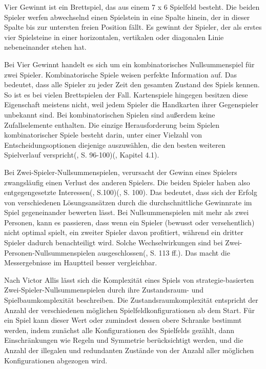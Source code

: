 Vier Gewinnt ist ein Brettspiel, das aus einem 7 x 6 Spielfeld besteht. Die beiden Spieler werfen abwechselnd einen Spielstein in eine Spalte hinein, der in dieser Spalte bis zur untersten freien Position fällt. Es gewinnt der Spieler, der als erstes vier Spielsteine in einer horizontalen, vertikalen oder diagonalen Linie nebeneinander stehen hat\cite{MiltonBradleyCompany.1990}.

Bei Vier Gewinnt handelt es sich um ein kombinatorisches Nullsummenspiel für zwei Spieler. Kombinatorische Spiele weisen \glqq perfekte Information\grqq{} auf. Das bedeutet, dass alle Spieler zu jeder Zeit den gesamten Zustand des Spiels kennen. So ist es bei vielen Brettspielen der Fall. Kartenspiele hingegen besitzen diese Eigenschaft meistens nicht, weil jedem Spieler die Handkarten ihrer Gegenspieler unbekannt sind. Bei kombinatorischen Spielen sind außerdem keine Zufallselemente enthalten. Die einzige Herausforderung beim Spielen kombinatorischer Spiele besteht darin, unter einer Vielzahl von Entscheidungsoptionen diejenige auszuwählen, die den besten weiteren Spielverlauf verspricht(\cite{Bewersdorff.2018}, S. 96-100)(\cite{Ferguson.January2019}, Kapitel 4.1).

Bei Zwei-Spieler-Nullsummenspielen, verursacht der Gewinn eines Spielers zwangsläufig einen Verlust des anderen Spielers. Die beiden Spieler haben also entgegengesetzte Interessen(\cite{Bewersdorff.2018}, S.100)(\cite{Allis.1994}, S. 100). Das bedeutet, dass sich der Erfolg von verschiedenen Lösungsansätzen durch die durchschnittliche Gewinnrate im Spiel gegeneinander bewerten lässt. Bei Nullsummenspielen mit mehr als zwei Personen, kann es passieren, dass wenn ein Spieler (bewusst oder versehentlich) nicht optimal spielt, ein zweiter Spieler davon profitiert, während ein dritter Spieler dadurch benachteiligt wird. Solche Wechselwirkungen sind bei Zwei-Personen-Nullsummenspielen ausgeschlossen(\cite{Bewersdorff.2018}, S. 113 ff.). Das macht die Messergebnisse im Hauptteil besser vergleichbar.

Nach Victor Allis lässt sich die Komplexität eines Spiels von strategie-basierten Zwei-Spieler-Nullsummenspielen durch ihre Zustandsraum- und Spielbaumkomplexität beschreiben. Die Zustandsraumkomplexität entspricht der Anzahl der verschiedenen möglichen Spielfeldkonfigurationen ab dem Start. Für ein Spiel kann dieser Wert oder zumindest dessen obere Schranke bestimmt werden, indem zunächst alle Konfigurationen des Spielfelds gezählt, dann Einschränkungen wie Regeln und Symmetrie berücksichtigt werden, und die Anzahl der illegalen und redundanten Zustände von der Anzahl aller möglichen Konfigurationen abgezogen wird\cite{Allis.1994}.

